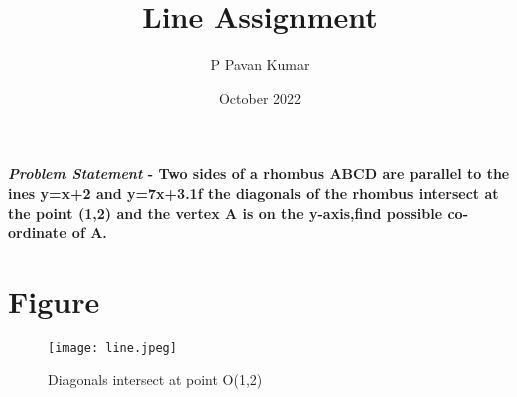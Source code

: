 \documentclass[journal,10pt,twocolumn]{article}
\title{\textbf{Line Assignment}}
\author{P Pavan Kumar}
\date{October 2022}
\begin{document}
\maketitle
\paragraph{\textit{Problem Statement} - Two sides of a rhombus ABCD are parallel to the ines y=x+2 and y=7x+3.1f the diagonals of the rhombus intersect at the point (1,2) and the vertex A is on the y-axis,find possible co-ordinate of A.}

\section*{\large Figure}

\begin{figure}[H]
\centering
\texttt{[image: line.jpeg]}
\caption{Diagonals intersect at point O(1,2)}
\label{fig:triangle}
\end{figure}
\end{document}
